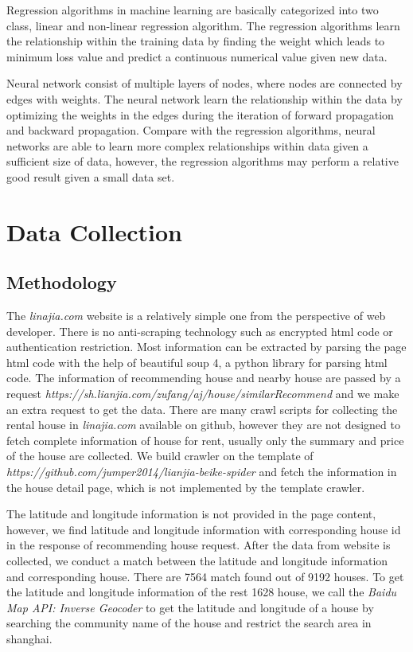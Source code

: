 \documentclass[final]{cvpr}
\begin{document}
Regression algorithms in machine learning are basically categorized into two class, linear and non-linear regression algorithm. The regression algorithms learn the relationship within the training data by finding the weight which leads to minimum loss value and predict a continuous numerical value given new data.

Neural network consist of multiple layers of nodes, where nodes are connected by edges with weights. The neural network learn the relationship within the data by optimizing the weights in the edges during the iteration of forward propagation and backward propagation. Compare with the regression algorithms, neural networks are able to learn more complex relationships within data given a sufficient size of data, however, the regression algorithms may perform a relative good result given a small data set.

\section{Data Collection}
\subsection{Methodology}
The \textit{linajia.com} website is a relatively simple one from the perspective of web developer. There is no anti-scraping technology such as encrypted html code or authentication restriction. Most information can be extracted by parsing the page html code with the help of beautiful soup 4, a python library for parsing html code. The information of recommending house and nearby house are passed by a request \textit{https://sh.lianjia.com/zufang/aj/house/similarRecommend} and we make an extra request to get the data.
There are many crawl scripts for collecting the rental house in \textit{linajia.com} available on github, however they are not designed to fetch complete information of house for rent, usually only the summary and price of the house are collected. We build crawler on the template of \textit{https://github.com/jumper2014/lianjia-beike-spider} and fetch the information in the house detail page, which is not implemented by the template crawler.

The latitude and longitude information is not provided in the page content, however, we find latitude and longitude information with corresponding house id in the response of recommending house request. After the data from website is collected, we conduct a match between the latitude and longitude information and corresponding house. There are 7564 match found out of 9192 houses. To get the latitude and longitude information of the rest 1628 house, we call the \textit{Baidu Map API: Inverse Geocoder} to get the latitude and longitude of a house by searching the community name of the house and restrict the search area in shanghai.
\end{document}
